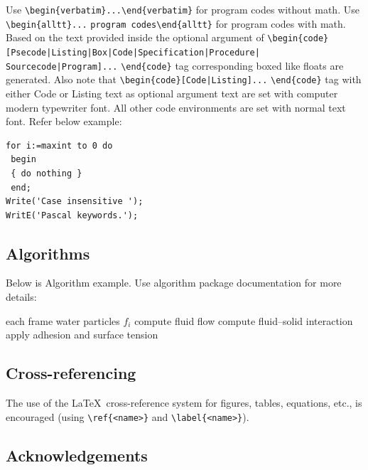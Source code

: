 \documentclass[cmbright]{WileySTAT-V1} %
\theoremstyle{plain}
\begin{document}
Use \verb+\begin{verbatim}...\end{verbatim}+ for program codes without math. Use \verb+\begin{alltt}...+ \verb+program codes\end{alltt}+ for program codes with math. Based on the text provided inside the optional argument of \verb+\begin{code}[Psecode|Listing|Box|Code|Specification|Procedure|+ \verb+Sourcecode|Program]...+ \verb+\end{code}+ tag corresponding boxed like floats are generated. Also note that \verb+\begin{code}[Code|Listing]...+ \verb+\end{code}+ tag with either Code or Listing text as optional argument text are set with computer modern typewriter font. All other code environments are set with normal text font. Refer below example:

\begin{lstlisting}[caption={Descriptive Caption Text},label=DescriptiveLabel]
for i:=maxint to 0 do
 begin
 { do nothing }
 end;
Write('Case insensitive ');
WritE('Pascal keywords.');
\end{lstlisting}

\subsection{Algorithms}\label{sec4.9}
Below is Algorithm example. Use algorithm package documentation for more details:
\begin{algorithm}
\caption{Pseudocode for our algorithm}\label{alg1}
\begin{algorithmic}
 \For each frame
 \For water particles $f_{i}$
 \State compute fluid flow
 \State compute fluid--solid interaction
 \State apply adhesion and surface tension
 \EndFor
 \EndFor
\end{algorithmic}
\end{algorithm}

\subsection{Cross-referencing}\label{sec4.10}

The use of the \LaTeX\ cross-reference system for figures, tables, equations, etc., is encouraged (using \verb"\ref{<name>}" and \verb"\label{<name>}").

\subsection{Acknowledgements}\label{sec4.11}
\end{document}

